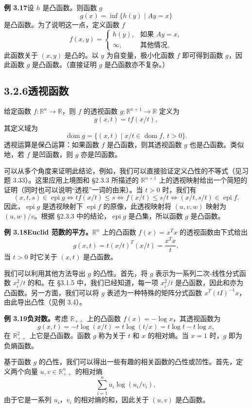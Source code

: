 \documentclass[UTF8, 12pt, fontset=fandol, oneside]{ctexart}
\DeclareMathOperator{\dom}{dom}
\DeclareMathOperator{\epi}{epi}
\begin{document}
\noindent\textbf{例 3.17}\quad 设 $h$ 是凸函数。则函数 $g$
\[
g(x)=\inf\{h(y)\mid Ay=x\}
\]
是凸函数。为了说明这一点，定义函数 $f$
\[
f(x,y)=
\begin{cases}
h(y), & \text{如果 }Ay=x,\\
\infty, & \text{其他情况},
\end{cases}
\]
此函数关于 $(x,y)$ 是凸的。以 $y$ 为自变量，极小化函数 $f$ 即可得到函数 $g$，因此函数 $g$ 是凸函数。（直接证明 $g$ 是凸函数亦不复杂。）

\subsection*{3.2.6\quad 透视函数}

给定函数 $f:\mathbb{R}^n\to\mathbb{R}$，则 $f$ 的透视函数 $g:\mathbb{R}^{n+1}\to\mathbb{R}$ 定义为
\[
g(x,t)=t f(x/t),
\]
其定义域为
\[
\dom g=\{(x,t)\mid x/t\in\dom f,\ t>0\}.
\]
透视运算是保凸运算：如果函数 $f$ 是凸函数，则其透视函数 $g$ 也是凸函数。类似地，若 $f$ 是凹函数，则 $g$ 亦是凹函数。

可以从多个角度来证明此结论，例如，我们可以直接验证定义凸性的不等式（见习题 3.33）。这里应用上境图和 \S2.3.3 所描述的 $\mathbb{R}^{n+1}$ 上的透视映射给出一个简短的证明（同时也可以说明“透视”一词的由来）。当 $t>0$ 时，我们有
\[
(x,t,s)\in\epi g
\Longleftrightarrow t f(x/t)\leq s
\Longleftrightarrow f(x/t)\leq s/t
\Longleftrightarrow (x/t,s/t)\in\epi f.
\]
因此，$\epi g$ 是透视映射下 $\epi f$ 的原像，此透视映射将 $(u,v,w)$ 映射为 $(u,w)/v$。根据 \S2.3.3 中的结论，$\epi g$ 是凸集，所以函数 $g$ 是凸函数。

\noindent\textbf{例 3.18\quad Euclid 范数的平方。}\quad $\mathbb{R}^n$ 上的凸函数 $f(x)=x^Tx$ 的透视函数由下式给出
\[
g(x,t)=t(x/t)^T(x/t)=\frac{x^Tx}{t},
\]
当 $t>0$ 时它关于 $(x,t)$ 是凸函数。

我们可以利用其他方法导出 $g$ 的凸性。首先，将 $g$ 表示为一系列二次-线性分式函数 $x_i^2/t$ 的和。在 \S3.1.5 中，我们已经知道，每一项 $x_i^2/t$ 是凸函数，因此和亦为凸函数。另一方面，我们可以将 $g$ 表述为一种特殊的矩阵分式函数 $x^T(tI)^{-1}x$，由此导出凸性（见例 3.4）。

\noindent\textbf{例 3.19\quad 负对数。}\quad 考虑 $\mathbb{R}_{++}$ 上的凸函数 $f(x)=-\log x$，其透视函数为
\[
g(x,t)=-t\log(x/t)=t\log(t/x)=t\log t-t\log x,
\]
在 $\mathbb{R}_{++}^2$ 上它是凸函数。函数 $g$ 称为关于 $t$ 和 $x$ 的相对熵。当 $x=1$ 时，$g$ 即为负熵函数。

基于函数 $g$ 的凸性，我们可以得出一些有趣的相关函数的凸性或凹性。首先，定义两个向量 $u,v\in\mathbb{R}_{++}^n$ 的相对熵
\[
\sum_{i=1}^n u_i\log(u_i/v_i),
\]
由于它是一系列 $u_i$，$v_i$ 的相对熵的和，因此关于 $(u,v)$ 是凸函数。
\end{document}
